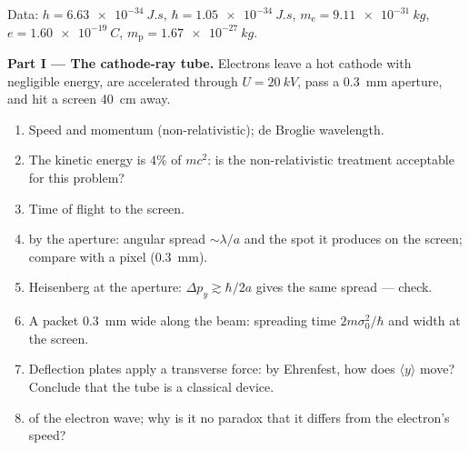 \begin{problem}\label{pb:b2:schrodinger-wave-functions:1}
Data: $h = \qty{6.63e-34}{J.s}$, $\hbar = \qty{1.05e-34}{J.s}$, $m_{\text{e}} =
\qty{9.11e-31}{kg}$, $e = \qty{1.60e-19}{C}$, $m_{\text{p}} = \qty{1.67e-27}{kg}$.

\textbf{Part I --- The cathode-ray tube.}
Electrons leave a hot cathode with negligible energy, are accelerated
through $U = \qty{20}{kV}$, pass a \qty{0.3}{mm} aperture, and hit a
screen \qty{40}{cm} away.
\begin{enumerate}
  \item Speed and momentum (non-relativistic); de Broglie wavelength.
  \item The kinetic energy is $4\%$ of $mc^2$: is the non-relativistic
        treatment acceptable for this problem?
  \item Time of flight to the screen.
  \item {} by the aperture: angular spread $\sim\lambda/a$ and
        the spot it produces on the screen; compare with a pixel
        (\qty{0.3}{mm}).
  \item Heisenberg at the aperture: $\Delta p_y \gtrsim \hbar/2a$ gives the
        same spread --- check.
  \item A packet \qty{0.3}{mm} wide along the beam: spreading time
        $2m\sigma_0^2/\hbar$ and width at the screen.
  \item Deflection plates apply a transverse force: by Ehrenfest, how
        does $\langle y\rangle$ move? Conclude that the tube is a
        classical device.
  \item {} of the electron wave; why is it no paradox that
        it differs from the electron's speed?
\end{enumerate}


\end{problem}
